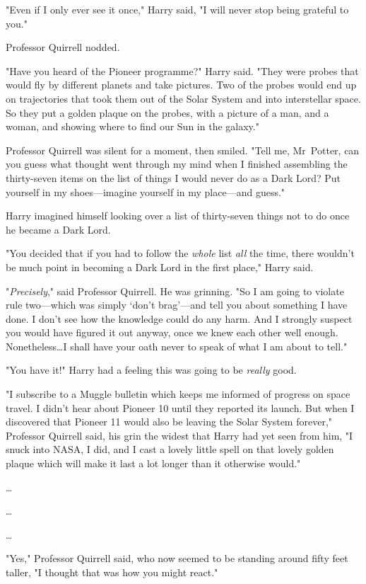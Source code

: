 "Even if I only ever see it once," Harry said, "I will never stop being
grateful to you."

Professor Quirrell nodded.

"Have you heard of the Pioneer programme?" Harry said. "They were probes that
would fly by different planets and take pictures. Two of the probes would end
up on trajectories that took them out of the Solar System and into interstellar
space. So they put a golden plaque on the probes, with a picture of a man, and
a woman, and showing where to find our Sun in the galaxy."

Professor Quirrell was silent for a moment, then smiled. "Tell me, Mr~Potter,
can you guess what thought went through my mind when I finished assembling the
thirty-seven items on the list of things I would never do as a Dark Lord? Put
yourself in my shoes---imagine yourself in my place---and guess."

Harry imagined himself looking over a list of thirty-seven things not to do
once he became a Dark Lord.

"You decided that if you had to follow the \emph{whole} list \emph{all} the
time, there wouldn't be much point in becoming a Dark Lord in the first place,"
Harry said.

"\emph{Precisely}," said Professor Quirrell. He was grinning. "So I am going to
violate rule two---which was simply `don't brag'---and tell you about something
I have done. I don't see how the knowledge could do any harm. And I strongly
suspect you would have figured it out anyway, once we knew each other well
enough. Nonetheless…I shall have your oath never to speak of what I am
about to tell."

"You have it!" Harry had a feeling this was going to be \emph{really} good.

"I subscribe to a Muggle bulletin which keeps me informed of progress on space
travel. I didn't hear about Pioneer 10 until they reported its launch. But when
I discovered that Pioneer 11 would also be leaving the Solar System forever,"
Professor Quirrell said, his grin the widest that Harry had yet seen from him,
"I snuck into NASA, I did, and I cast a lovely little spell on that lovely
golden plaque which will make it last a lot longer than it otherwise would."

…

…

…

"Yes," Professor Quirrell said, who now seemed to be standing around fifty feet
taller, "I thought that was how you might react."

